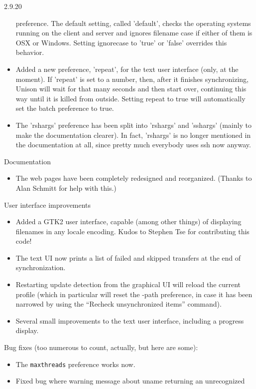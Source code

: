 \begin{changesfromversion}{2.9.20}
\begin{itemize}
  preference.  The default setting, called 'default', checks the operating systems
  running on the client and server and ignores filename case if either of them is
  OSX or Windows.  Setting ignorecase to 'true' or 'false' overrides this behavior.
\item Added a new preference, 'repeat', for the text user interface (only,
  at the moment).  If 'repeat' is set to a number, then, after it finishes
  synchronizing, Unison will wait for that many seconds and then start over,
  continuing this way until it is killed from outside.  Setting repeat to
  true will automatically set the batch preference to true.
\item The 'rshargs' preference has been split into 'rshargs' and 'sshargs'
  (mainly to make the documentation clearer).  In fact, 'rshargs' is no longer
  mentioned in the documentation at all, since pretty much everybody uses
  ssh now anyway.
\end{itemize}
\item Documentation
\begin{itemize}
\item The web pages have been completely redesigned and reorganized.
  (Thanks to Alan Schmitt for help with this.)
\end{itemize}
\item User interface improvements
\begin{itemize}
\item Added a GTK2 user interface, capable (among other things) of displaying filenames
  in any locale encoding.  Kudos to Stephen Tse for contributing this code!
\item The text UI now prints a list of failed and skipped transfers at the end of
  synchronization.
\item Restarting update detection from the graphical UI will reload the current
  profile (which in particular will reset the -path preference, in case
  it has been narrowed by using the ``Recheck unsynchronized items''
  command).
\item Several small improvements to the text user interface, including a
  progress display.
\end{itemize}
\item Bug fixes (too numerous to count, actually, but here are some):
\begin{itemize}
\item The {\tt maxthreads} preference works now.
\item Fixed bug where warning message about uname returning an unrecognized

\end{itemize}
\end{changesfromversion}
